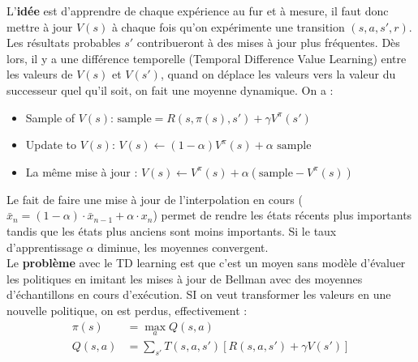 L'\textbf{idée} est d'apprendre de chaque expérience au fur et à mesure, il faut donc mettre à jour $V(s)$ à chaque fois qu'on
expérimente une transition $(s,a,s',r)$. Les résultats probables $s'$ contribueront à des mises à jour plus fréquentes. Dès lors,
il y a une différence temporelle (Temporal Difference Value Learning) entre les valeurs de $V(s)$ et $V(s')$, quand on déplace 
les valeurs vers la valeur du successeur quel qu'il soit, on fait une moyenne dynamique. On a :
\begin{itemize}[label=\textbullet]
    \item Sample of $V(s)$: $\text{sample}=R(s,\pi(s),s')+\gamma V^\pi(s')$
    \item Update to $V(s)$: $V(s)\leftarrow (1-\alpha)V^\pi(s)+\alpha\text{ sample}$
    \item La même mise à jour : $V(s)\leftarrow V^\pi(s)+\alpha(\text{sample}-V^\pi(s))$
\end{itemize}
Le fait de faire une mise à jour de l'interpolation en cours ($\bar{x}_n=(1-\alpha)\cdot\bar{x}_{n-1}+\alpha\cdot x_n$) permet
de rendre les états récents plus importants tandis que les états plus anciens sont moins importants. Si le taux d'apprentissage
$\alpha$ diminue, les moyennes convergent.\\
Le \textbf{problème} avec le TD learning est que c'est un moyen sans modèle d'évaluer les politiques en imitant les mises à jour
de Bellman avec des moyennes d'échantillons en cours d'exécution. SI on veut transformer les valeurs en une nouvelle politique,
on est perdus, effectivement :
\begin{equation*}
    \begin{aligned}
        \pi(s)&=\max\limits_{a} Q(s,a)\\
        Q(s,a)&=\sum_{s'}T(s,a,s')[R(s,a,s')+\gamma V(s')]
    \end{aligned}
\end{equation*}

